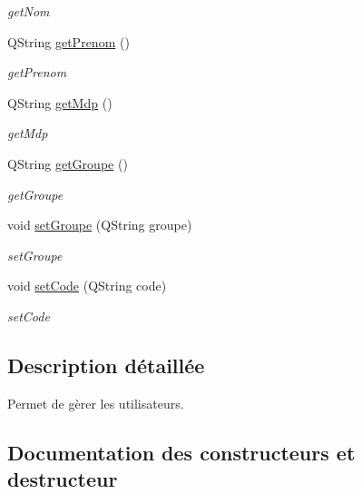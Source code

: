 \begin{DoxyCompactItemize}
\begin{DoxyCompactList}\small\item\em get\+Nom \end{DoxyCompactList}\item 
Q\+String \mbox{\hyperlink{class_utilisateur_a6b4d6fa5c9b5c8565c2f2d1f68df9bf3}{get\+Prenom}} ()
\begin{DoxyCompactList}\small\item\em get\+Prenom \end{DoxyCompactList}\item 
Q\+String \mbox{\hyperlink{class_utilisateur_a3d97468fbffac5a17f30a8f61ca9fa10}{get\+Mdp}} ()
\begin{DoxyCompactList}\small\item\em get\+Mdp \end{DoxyCompactList}\item 
Q\+String \mbox{\hyperlink{class_utilisateur_a7c2a356bebff3424cf58c84ca5698c8b}{get\+Groupe}} ()
\begin{DoxyCompactList}\small\item\em get\+Groupe \end{DoxyCompactList}\item 
void \mbox{\hyperlink{class_utilisateur_ad9f88d08f5bc9faed0138d92debf35fa}{set\+Groupe}} (Q\+String groupe)
\begin{DoxyCompactList}\small\item\em set\+Groupe \end{DoxyCompactList}\item 
void \mbox{\hyperlink{class_utilisateur_aba69ae1c6239270a80768ce540014a92}{set\+Code}} (Q\+String code)
\begin{DoxyCompactList}\small\item\em set\+Code \end{DoxyCompactList}\end{DoxyCompactItemize}


\subsection{Description détaillée}
Permet de gèrer les utilisateurs. 

\subsection{Documentation des constructeurs et destructeur}
\mbox{\label{class_utilisateur_aab43c0ee89962ff55479cb8f1fd19fa8}} 
